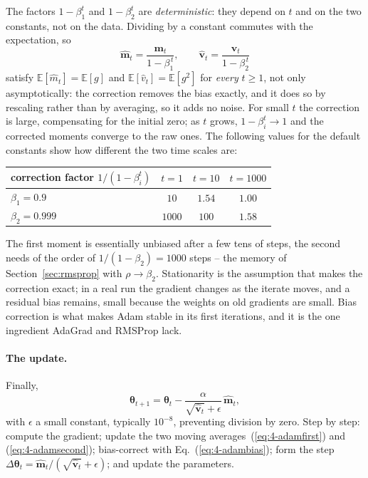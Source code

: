 The factors $1-\beta_1^{t}$ and $1-\beta_2^{t}$ are \emph{deterministic}: they
depend on $t$ and on the two constants, not on the data.  Dividing by a
constant commutes with the expectation, so
\begin{equation}
  \hat{\bm{m}}_t = \frac{\bm{m}_t}{1-\beta_1^{\,t}},
  \qquad
  \hat{\bm{v}}_t = \frac{\bm{v}_t}{1-\beta_2^{\,t}}
  \label{eq:4-adambias}
\end{equation}
satisfy $\mathbb{E}[\hat m_t]=\mathbb{E}[g]$ and
$\mathbb{E}[\hat v_t]=\mathbb{E}[g^{2}]$ for \emph{every} $t\ge1$, not only
asymptotically: the correction removes the bias exactly, and it does so by
rescaling rather than by averaging, so it adds no noise.  For small $t$ the
correction is large, compensating for the initial zero; as $t$ grows,
$1-\beta_i^{t}\to1$ and the corrected moments converge to the raw ones.  The
following values for the default constants show how different the two time
scales are:
\begin{center}
\begin{tabular}{lccc}
\hline
correction factor $1/(1-\beta_i^{t})$ & $t=1$ & $t=10$ & $t=1000$ \\
\hline
$\beta_1=0.9$   & $10$   & $1.54$ & $1.00$ \\
$\beta_2=0.999$ & $1000$ & $100$  & $1.58$ \\
\hline
\end{tabular}
\end{center}
The first moment is essentially unbiased after a few tens of steps, the second
needs of the order of $1/(1-\beta_2)=1000$ steps -- the memory of
Section~\ref{sec:rmsprop} with $\rho\to\beta_2$.  Stationarity is the
assumption that makes the correction exact; in a real run the gradient
changes as the iterate moves, and a residual bias remains, small because the
weights on old gradients are small.  Bias correction is what makes Adam
stable in its first iterations, and it is the one ingredient AdaGrad and
RMSProp lack.

\paragraph{The update.}
Finally,
\begin{equation}
  \boxed{\;
  \bm{\theta}_{t+1} = \bm{\theta}_t
    - \frac{\alpha}{\sqrt{\hat{\bm{v}}_t}+\epsilon}\,\hat{\bm{m}}_t , \;}
  \label{eq:4-adam}
\end{equation}
with $\epsilon$ a small constant, typically $10^{-8}$, preventing division by
zero.  Step by step: compute the gradient; update the two moving
averages~(\ref{eq:4-adamfirst}) and (\ref{eq:4-adamsecond}); bias-correct with
Eq.~(\ref{eq:4-adambias}); form the step
$\Delta\bm{\theta}_t=\hat{\bm{m}}_t/(\sqrt{\hat{\bm{v}}_t}+\epsilon)$; and
update the parameters.

